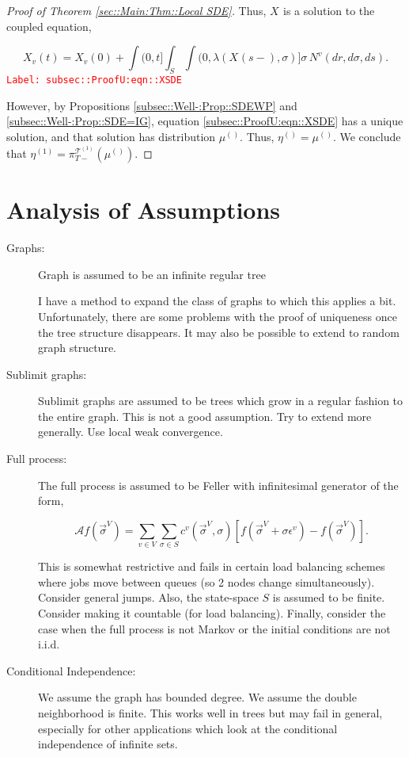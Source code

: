\documentclass[12pt]{article}
\newcommand{\mc}{\mathcal}
\newcommand{\ep}{\epsilon}
\newcommand{\tr}{\textcolor{red}}
\newcommand{\labe}[1]{\tr{\texttt{Label: #1}}}
\renewcommand{\v}{v}							%
\renewcommand{\S}{S}							%
\newcommand{\s}{\sigma}							%
\newcommand{\sv}{\vec{\s}}						%
\newcommand{\ev}{\ep}							%
\newcommand{\T}{T}								%
\renewcommand{\t}{t}							%
\newcommand{\proj}{\pi}							%
\renewcommand{\tt}{s}							%
\newcommand{\X}{X}								%
\newcommand{\IG}{\mc{A}}						%
\newcommand{\IGr}{c}							%
\newcommand{\vind}[1]{^{#1}}					%
\newcommand{\vsi}[1]{^{#1}}						%
\newcommand{\cind}[1]{_{#1}}					%
\newcommand{\tp}[1]{(#1)}						%
\newcommand{\tip}[1]{#1}						%
\newcommand{\ts}[1]{_{#1}}						%
\newcommand{\tree}{\mc{T}}						%
\newcommand{\sln}[1]{^{(#1)}}					%
\newcommand{\poiss}{N}							%
\newcommand{\rate}{\lambda}						%
\renewcommand{\r}{r}							%
\newcommand{\m}{\mu}							%
\newcommand{\mmm}{\eta}							%
\begin{document}
\begin{proof}[Proof of Theorem \ref{sec::Main:Thm::Local SDE}]
Thus, \(\X\cind{}\tip{}\) is a solution to the coupled equation,

\begin{equation}
\X\cind{\v}\tp{\t} = \X\cind{\v}\tp{0} + \int{(0,\t]}\int_\S \int{(0,\rate(\X\cind{}\tp{\tt-},\s)]}\s\,\poiss\vind{\v}(d\r,d\s,d\tt).
\label{subsec::ProofU:eqn::XSDE}
\end{equation}
\labe{subsec::ProofU:eqn::XSDE}

However, by Propositions \ref{subsec::Well-:Prop::SDEWP} and \ref{subsec::Well-:Prop::SDE=IG}, equation \eqref{subsec::ProofU:eqn::XSDE} has a unique solution, and that solution has distribution \(\m\sln{}\ts{}\). Thus, \(\mmm\sln{}\ts{} = \m\sln{}\ts{}\). We conclude that \(\mmm\sln{1}\ts{} = \proj\vsi{\tree\sln{1}}\ts{\T-}(\m\sln{}\ts{})\).

\end{proof}

\section{Analysis of Assumptions}

\begin{description}
\item[Graphs: ] Graph is assumed to be an infinite regular tree

I have a method to expand the class of graphs to which this applies a bit. Unfortunately, there are some problems with the proof of uniqueness once the tree structure disappears. It may also be possible to extend to random graph structure.

\item[Sublimit graphs: ] Sublimit graphs are assumed to be trees which grow in a regular fashion to the entire graph. This is not a good assumption. Try to extend more generally. Use local weak convergence.

\item[Full process: ] The full process is assumed to be Feller with infinitesimal generator of the form,

\[\IG f(\sv\cind{}\vsi{V}) = \sum_{\v \in V}\sum_{\s \in \S} \IGr\vind{\v}(\sv\cind{}\vsi{V},\s)[f(\sv\cind{}\vsi{V} + \s \ev\vind{\v}) - f(\sv\cind{}\vsi{V})].\]

This is somewhat restrictive and fails in certain load balancing schemes where jobs move between queues (so 2 nodes change simultaneously). Consider general jumps. Also, the state-space \(\S\) is assumed to be finite. Consider making it countable (for load balancing). Finally, consider the case when the full process is not Markov or the initial conditions are not i.i.d.

\item[Conditional Independence: ] We assume the graph has bounded degree. We assume the double neighborhood is finite. This works well in trees but may fail in general, especially for other applications which look at the conditional independence of infinite sets.
\end{description}
\end{document}
